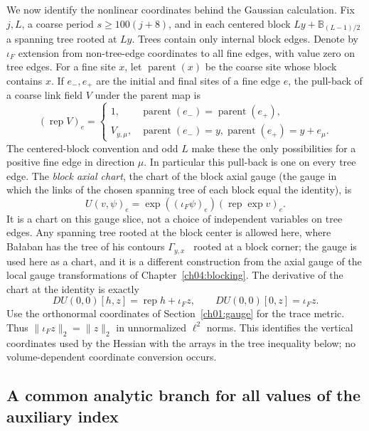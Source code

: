 We now identify the nonlinear coordinates behind the Gaussian calculation.
Fix $j,L$, a coarse period $s\ge100(j+8)$, and in each centered block
$Ly+\mathbb B_{(L-1)/2}$ a spanning tree rooted at $Ly$. Trees contain
only internal block edges. Denote by $\iota_F$ extension from non-tree-edge
coordinates to all fine edges, with value zero on tree edges. For a fine site $x$, let $\operatorname{parent}(x)$ be the coarse site
whose block contains $x$. If $e_-,e_+$ are the initial and final sites
of a fine edge $e$, the pull-back of a coarse link field $V$ under the parent map is
\[
 (\operatorname{rep}V)_e=
 \begin{cases}1,&\operatorname{parent}(e_-)=\operatorname{parent}(e_+),\\
 V_{y,\mu},&\operatorname{parent}(e_-)=y,
                    \operatorname{parent}(e_+)=y+e_\mu.
 \end{cases}
\]
The centered-block convention and odd $L$ make these the only possibilities
for a positive fine edge in direction $\mu$. In particular this pull-back
is one on every tree edge. The \emph{block axial chart}, the chart of the block axial gauge (the gauge in which the links of the chosen spanning tree of each block equal the identity), is
\begin{equation}
 U(v,\psi)_e=\exp((\iota_F\psi)_e)
                         (\operatorname{rep}\exp v)_e.
 \label{ch05:forest-chart}
\end{equation}
It is a chart on this gauge slice, not a choice of independent variables on
tree edges. Any spanning tree rooted at the block center is allowed here, where Ba{\l}aban has the tree of his contours $\Gamma_{y,x}$~\cite{Balaban1984Propagators} rooted at a block corner; the gauge is used here as a chart, and it is a different construction from the axial gauge of the local gauge transformations of Chapter~\ref{ch04:blocking}. The derivative of the chart at the identity is exactly
\begin{equation}
 DU(0,0)[h,z]=\operatorname{rep}h+\iota_Fz,
 \qquad DU(0,0)[0,z]=\iota_Fz.
 \label{ch05:forest-derivative}
\end{equation}
Use the orthonormal coordinates of Section~\ref{ch01:gauge} for the trace metric. Thus
$\|\iota_Fz\|_2=\|z\|_2$ in unnormalized $\ell^2$ norms. This identifies the vertical
coordinates used by the Hessian with the arrays in the tree inequality
below; no volume-dependent coordinate conversion occurs.

\subsection{A common analytic branch for all values of the auxiliary index}

